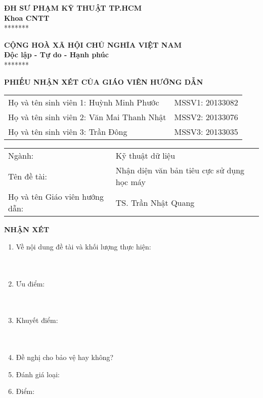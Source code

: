 
\thispagestyle{empty}
\noindent\begin{minipage}[t]{0.43\textwidth}
    \centering
    \fontsize{11pt}{16.5pt}
    \textbf{ĐH SƯ PHẠM KỸ THUẬT TP.HCM}\\
    \textbf{Khoa CNTT}\\
    *******
\end{minipage}
\begin{minipage}[t]{0.57\textwidth}
    \centering
    \fontsize{11pt}{16.5pt}
    \textbf{CỘNG HOÀ XÃ HỘI CHỦ NGHĨA VIỆT NAM}\\
    \textbf{Độc lập - Tự do - Hạnh phúc}\\
    *******
\end{minipage}
\begin{center}
    \fontsize{18pt}{27pt}
    \textbf{PHIẾU NHẬN XÉT CỦA GIÁO VIÊN HƯỚNG DẪN}
\end{center}
\begin{table}[!h]
    \centering
    \begin{tabularx}{0.8\textwidth}{ X c }
        Họ và tên sinh viên 1: Huỳnh Minh Phước   & MSSV1: 20133082 \\
        Họ và tên sinh viên 2: Văn Mai Thanh Nhật & MSSV2: 20133076 \\
        Họ và tên sinh viên 3: Trần Đông          & MSSV3: 20133035 \\
    \end{tabularx}
\end{table}
\begin{center}
    \begin{tabular}{p{} p{}}
        Ngành: & Kỹ thuật dữ liệu \\
        Tên đề tài: & Nhận diện văn bản tiêu cực sử dụng học máy\\
        Họ và tên Giáo viên hướng dẫn: & TS. Trần Nhật Quang
    \end{tabular}
\end{center}
\textbf{NHẬN XÉT}
\begin{enumerate}
    \item Về nội dung đề tài và khối lượng thực hiện:\\
          \mbox{}\dotfill\\
          \mbox{}\dotfill\\
          \mbox{}\dotfill
    \item Ưu điểm:\\
          \mbox{}\dotfill\\
          \mbox{}\dotfill\\
          \mbox{}\dotfill
    \item Khuyết điểm:\\
          \mbox{}\dotfill\\
          \mbox{}\dotfill\\
          \mbox{}\dotfill
    \item Đề nghị cho bảo vệ hay không?
    \item Đánh giá loại:
    \item Điểm:
\end{enumerate}
